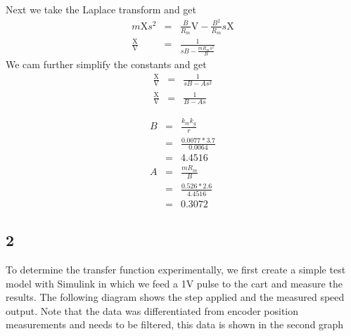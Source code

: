 \documentclass{article}
\begin{document}
Next we take the Laplace transform and get
\begin{eqnarray*}
    m\mathrm{X}s^2 &=& \frac{B}{R_m}  \mathrm{V} - \frac{B^2}{R_m}s\mathrm{X}\\
    \frac{\mathrm{X}}{\mathrm{V}} &=& \frac{1}{sB - \frac{mR_m s^2}{B}}
\end{eqnarray*}
We cam further simplify the constants and get
\begin{eqnarray*}
    \frac{\mathrm{X}}{\mathrm{V}} &=& \frac{1}{sB - As^2}\\
    \frac{\mathrm{\dot{X}}}{\mathrm{V}} &=& \frac{1}{B - As}
\end{eqnarray*}

\begin{eqnarray*}
    B &=& \frac{k_m k_g}{r}\\
    &=& \frac{0.0077 * 3.7}{0.0064}\\
    &=& 4.4516\\
    A &=& \frac{m R_m}{B}\\
    &=& \frac{0.526 * 2.6}{4.4516}\\
    &=& 0.3072
\end{eqnarray*}

\subsection*{2}
To determine the transfer function experimentally, we first create a simple test model with Simulink in which we feed a 1V pulse to the cart and measure the results. The following diagram shows the step applied and the measured speed output. Note that the data was differentiated from encoder position measurements and needs to be filtered, this data is shown in the second graph
\end{document}

